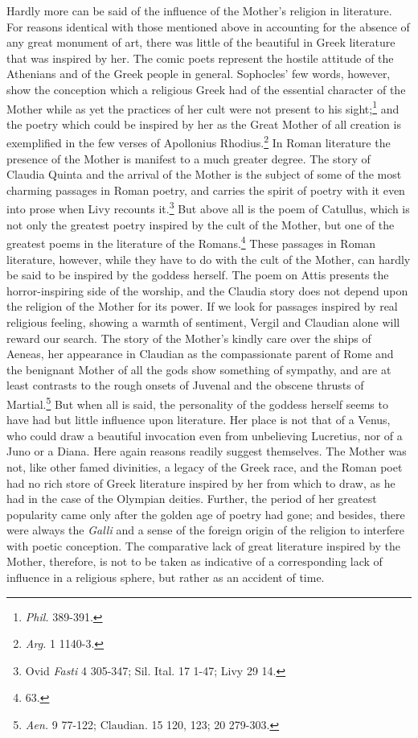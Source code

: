 \documentclass[a4paper, 11pt, oneside, polutonikogreek, english]{article}
\begin{document}
Hardly more can be said of the influence of the Mother's religion in literature. For reasons identical with those mentioned above in accounting for the absence of any great monument of art, there was little of the beautiful in Greek literature that was inspired by her. The comic poets represent the hostile attitude of the Athenians and of the Greek people in general. Sophocles' few words, however, show the conception which a religious Greek had of the essential character of the Mother while as yet the practices of her cult were not present to his sight;\footnote{\emph{Phil.} 389-391.} and the poetry which could be inspired by her as the Great Mother of all creation is exemplified in the few verses of Apollonius Rhodius.\footnote{\emph{Arg.} 1 1140-3.} In Roman literature the presence of the Mother is manifest to a much greater degree. The story of Claudia Quinta and the arrival of the Mother is the subject of some of the most charming passages in Roman poetry, and carries the spirit of poetry with it even into prose when Livy recounts it.\footnote{Ovid \emph{Fasti} 4 305-347; Sil. Ital. 17 1-47; Livy 29 14.} But above all is the poem of Catullus, which is not only the greatest poetry inspired by the cult of the Mother, but one of the greatest poems in the literature of the Romans.\footnote{63.} These passages in Roman literature, however, while they have to do with the cult of the Mother, can hardly be said to be inspired by the goddess herself. The poem on Attis presents the horror-inspiring side of the worship, and the Claudia story does not depend upon the religion of the Mother for its power. If we look for passages inspired by real religious feeling, showing a warmth of sentiment, Vergil and Claudian alone will reward our search. The story of the Mother's kindly care over the ships of Aeneas, her appearance in Claudian as the compassionate parent of Rome and the benignant Mother of all the gods show something of sympathy, and are at least contrasts to the rough onsets of Juvenal and the obscene thrusts of Martial.\footnote{\emph{Aen.} 9 77-122; Claudian. 15 120, 123; 20 279-303.} But when all is said, the personality of the goddess herself seems to have had but little influence upon literature. Her place is not that of a Venus, who could draw a beautiful invocation even from unbelieving Lucretius, nor of a Juno or a Diana. Here again reasons readily suggest themselves. The Mother was not, like other famed divinities, a legacy of the Greek race, and the Roman poet had no rich store of Greek literature inspired by her from which to draw, as he had in the case of the Olympian deities. Further, the period of her greatest popularity came only after the golden age of poetry had gone; and besides, there were always the \emph{Galli} and a sense of the foreign origin of the religion to interfere with poetic conception. The comparative lack of great literature inspired by the Mother, therefore, is not to be taken as indicative of a corresponding lack of influence in a religious sphere, but rather as an accident of time.
\end{document}
